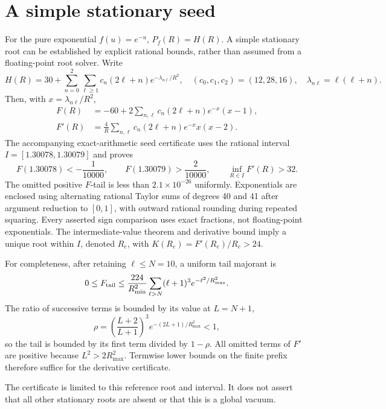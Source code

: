 \documentclass[11pt,letterpaper]{article}
\begin{document}
\section{A simple stationary seed}

For the pure exponential $f(u)=e^{-u}$, $P_f(R)=H(R)$. A simple stationary root can be established by explicit rational bounds, rather than assumed from a floating-point root solver. Write
\begin{equation}
 H(R)=30+\sum_{n=0}^{2}\sum_{\ell\geq1}c_n(2\ell+n)e^{-\lambda_{n\ell}/R^2},
 \quad (c_0,c_1,c_2)=(12,28,16),\quad \lambda_{n\ell}=\ell(\ell+n).
\end{equation}
Then, with $x=\lambda_{n\ell}/R^2$,
\begin{align}
 F(R)&=-60+2\sum_{n,\ell}c_n(2\ell+n)e^{-x}(x-1),\\
 F'(R)&=\frac4R\sum_{n,\ell}c_n(2\ell+n)e^{-x}x(x-2).
\end{align}
The accompanying exact-arithmetic seed certificate uses the rational interval $I=[1.30078,1.30079]$ and proves
\begin{equation}
 F(1.30078)<-\frac1{10000},\qquad
 F(1.30079)>\frac2{10000},\qquad
 \inf_{R\in I}F'(R)>32.
\end{equation}
The omitted positive $F$-tail is less than $2.1\times10^{-26}$ uniformly. Exponentials are enclosed using alternating rational Taylor sums of degrees 40 and 41 after argument reduction to $[0,1]$, with outward rational rounding during repeated squaring. Every asserted sign comparison uses exact fractions, not floating-point exponentials. The intermediate-value theorem and derivative bound imply a unique root within $I$, denoted $R_e$, with $K(R_e)=F'(R_e)/R_e>24$.

For completeness, after retaining $\ell\leq N=10$, a uniform tail majorant is
\begin{equation}
0\leq F_{\rm tail}\leq\frac{224}{R_{\min}^2}
\sum_{\ell>N}(\ell+1)^3e^{-\ell^2/R_{\max}^2}.
\end{equation}
The ratio of successive terms is bounded by its value at $L=N+1$,
\begin{equation}
\rho=\left(\frac{L+2}{L+1}\right)^3e^{-(2L+1)/R_{\max}^2}<1,
\end{equation}
so the tail is bounded by its first term divided by $1-\rho$. All omitted terms of $F'$ are positive because $L^2>2R_{\max}^2$. Termwise lower bounds on the finite prefix therefore suffice for the derivative certificate.

The certificate is limited to this reference root and interval. It does not assert that all other stationary roots are absent or that this is a global vacuum.
\end{document}
